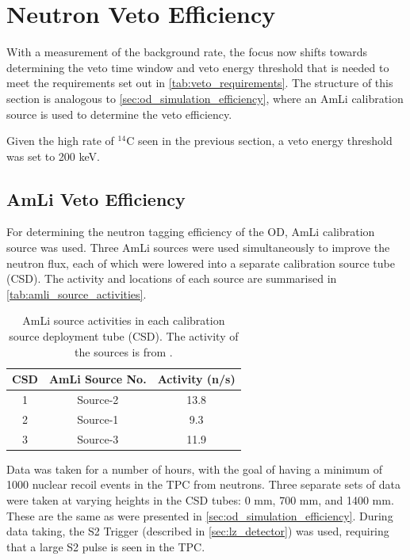 \section{Neutron Veto Efficiency}
\label{sec:od_analysis_veto_efficiency}
\par
With a measurement of the background rate, the focus now shifts towards determining the veto time window and veto energy threshold that is needed to meet the requirements set out in \autoref{tab:veto_requirements}.
The structure of this section is analogous to \autoref{sec:od_simulation_efficiency}, where an AmLi calibration source is used to determine the veto efficiency.
\par
Given the high rate of ${}^{14}$C seen in the previous section, a veto energy threshold was set to 200 keV.

\subsection{AmLi Veto Efficiency}
\par
For determining the neutron tagging efficiency of the OD, AmLi calibration source was used.
Three AmLi sources were used simultaneously to improve the neutron flux, each of which were lowered into a separate calibration source tube (CSD).
The activity and locations of each source are summarised in \autoref{tab:amli_source_activities}.

\begin{table}[]
    \centering
    \begin{tabular}{c|c|c}
        CSD & AmLi Source No. & Activity (n/s) \\ \hline
        1   & Source-2        & 13.8           \\
        2   & Source-1        & 9.3            \\ 
        3   & Source-3        & 11.9                
    \end{tabular}
    \caption{AmLi source activities in each calibration source deployment tube (CSD).
             The activity of the sources is from \cite{LZ_TechnicalDesignReview_ref}.}
    \label{tab:amli_source_activities}
\end{table}

\par
Data was taken for a number of hours, with the goal of having a minimum of 1000 nuclear recoil events in the TPC from neutrons.
Three separate sets of data were taken at varying heights in the CSD tubes: 0 mm, 700 mm, and 1400 mm.
These are the same as were presented in \autoref{sec:od_simulation_efficiency}.
During data taking, the S2 Trigger (described in \autoref{sec:lz_detector}) was used, requiring that a large S2 pulse is seen in the TPC.

